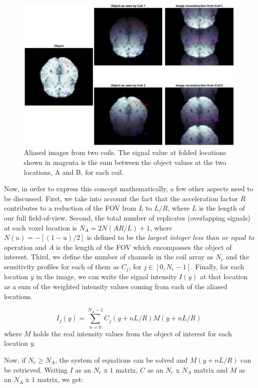 \begin{figure}[H]
    \centering
    \includegraphics[width=1\textwidth,keepaspectratio]{senserecbrains}
    \caption{Aliased images from two coils. The signal value at folded locations shown in magenta is the sum between the object values at the two locations, A and B, for each coil.}
    \label{fig:senserecbrains}
\end{figure}

Now, in order to express this concept mathematically, a few other aspects need to be discussed. First, we take into account the fact that the acceleration factor $R$ contributes to a reduction of the FOV from $L$ to $L/R$, where $L$ is the length of our full field-of-view. Second, the total number of replicates (overlapping signals) at each voxel location is $N_A = 2 N(AR/L) + 1$, where $N(u) = -[(1-u)/2]$ is defined to be the \textit{largest integer less than or equal to} operation and $A$ is the length of the FOV which encompasses the object of interest. Third, we define the number of channels in the coil array as $N_c$ and the sensitivity profiles for each of them as $C_j$, for $j \in [0, N_c-1]$. Finally, for each location $y$ in the image, we can write the signal intensity $I(y)$ at that location as a sum of the weighted intensity values coming from each of the aliased locations. 

\begin{equation} \label{eq:45}
    I_j(y)  = \sum_{n=0}^{N_A-1} C_j(y+nL/R) M(y+nL/R)
\end{equation}
where $M$ holds the real intensity values from the object of interest for each location $y$.

Now, if $N_c \geq N_A$, the system of equations can be solved and $M(y+nL/R)$ can be retrieved. Writing $I$ as an $N_c$ x $1$ matrix, $C$ as an $N_c$ x $N_A$ matrix and $M$ as an $N_A$ x $1$ matrix, we get:

